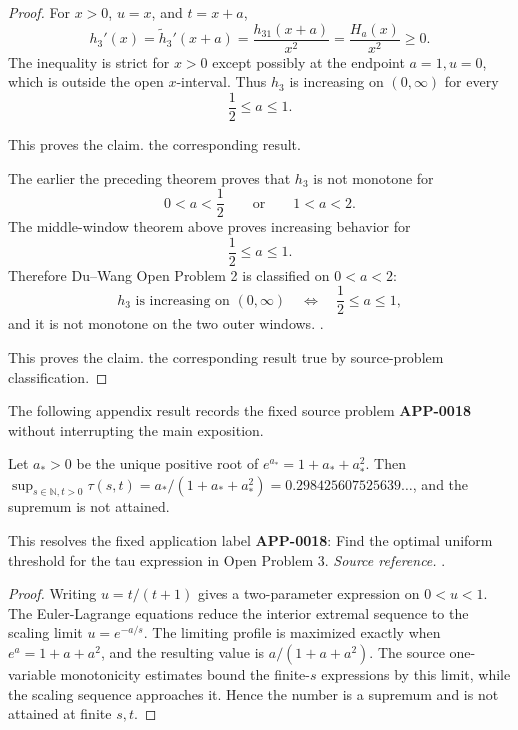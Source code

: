 \begin{proof}
For \(x>0\), \(u=x\), and \(t=x+a\),
\[
h_3'(x)=\widetilde h_3'(x+a)=\frac{h_{31}(x+a)}{x^2}
=\frac{H_a(x)}{x^2}\ge0.
\]
The inequality is strict for \(x>0\) except possibly at the endpoint
\(a=1,u=0\), which is outside the open \(x\)-interval.  Thus \(h_3\) is
increasing on \((0,\infty)\) for every
\[
\frac12\le a\le1.
\]

This proves the claim.
the corresponding result.

The earlier the preceding theorem proves that
\(h_3\) is not monotone for
\[
0<a<\frac12
\qquad\text{or}\qquad
1<a<2.
\]
The middle-window theorem above proves increasing behavior for
\[
\frac12\le a\le1.
\]
Therefore Du--Wang Open Problem 2 is classified on \(0<a<2\):
\[
h_3 \text{ is increasing on }(0,\infty)
\quad\Longleftrightarrow\quad
\frac12\le a\le1,
\]
and it is not monotone on the two outer windows. \cite{du-wang-h3}.

This proves the claim.
the corresponding result true by source-problem classification.
\end{proof}

The following appendix result records the fixed source problem \textbf{APP-0018} \cite{qi-guo-2004} without interrupting the main exposition.
\begin{proposition}
\label{res:qg-tau-global-supremum}
Let \(a_*>0\) be the unique positive root of \(e^{a_*}=1+a_*+a_*^2\). Then \(\sup_{s\in\mathbb N,t>0}\tau(s,t)=a_*/(1+a_*+a_*^2)=0.298425607525639\ldots\), and the supremum is not attained.

This resolves the fixed application label \textbf{APP-0018}: Find the optimal uniform threshold for the tau expression in Open Problem 3.
\emph{Source reference.} \cite{qi-guo-2004}.
\end{proposition}
\begin{proof}
Writing \(u=t/(t+1)\) gives a two-parameter expression on \(0<u<1\).  The
Euler-Lagrange equations reduce the interior extremal sequence to the scaling
limit \(u=e^{-a/s}\).  The limiting profile is maximized exactly when
\(e^a=1+a+a^2\), and the resulting value is \(a/(1+a+a^2)\).  The source
one-variable monotonicity estimates bound the finite-\(s\) expressions by this
limit, while the scaling sequence approaches it.  Hence the number is a
supremum and is not attained at finite \(s,t\).
\end{proof}

